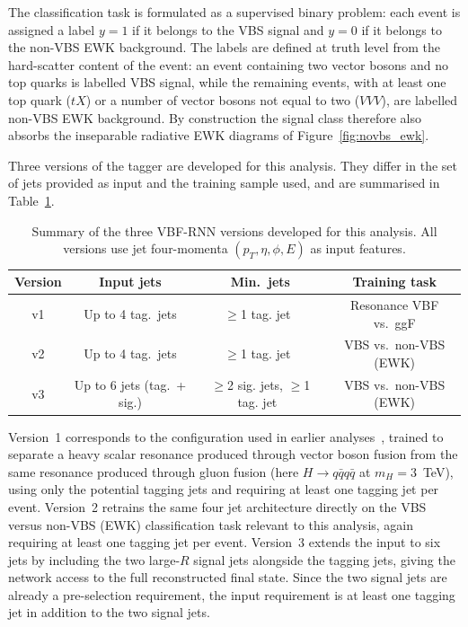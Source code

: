 The classification task is formulated as a supervised binary problem: each event is assigned a label $y = 1$ if it belongs to the VBS signal and $y = 0$ if it belongs to the non-VBS EWK background. The labels are defined at truth level from the hard-scatter content of the event: an event containing two vector bosons and no top quarks is labelled VBS signal, while the remaining events, with at least one top quark ($tX$) or a number of vector bosons not equal to two ($VVV$), are labelled non-VBS EWK background. By construction the signal class therefore also absorbs the inseparable radiative EWK diagrams of Figure~\ref{fig:novbs_ewk}.

Three versions of the tagger are developed for this analysis. They differ in the set of jets provided as input and the training sample used, and are summarised in Table~\ref{tab:vbfrnn_versions}.

\begin{table}[htbp]
  \centering
  \caption{Summary of the three VBF-RNN versions developed for this analysis. All versions use jet four-momenta $(p_T, \eta, \phi, E)$ as input features.}
  \label{tab:vbfrnn_versions}
  \begin{tabular}{|c|c|c|c|}
    \hline
    \textbf{Version} & \textbf{Input jets} & \textbf{Min.\ jets} & \textbf{Training task} \\
    \hline
    v1 & Up to 4 tag.\ jets            & $\geq$1 tag. jet\          & Resonance VBF vs.\ ggF \\
    v2 & Up to 4 tag.\ jets            & $\geq$1 tag. jet\          & VBS vs.\ non-VBS (EWK) \\
    v3 & Up to 6 jets (tag.\ + sig.)  & $\geq$2 sig. jets, $\geq$1 tag. jet\ & VBS vs.\ non-VBS (EWK) \\
    \hline
  \end{tabular}
\end{table}

Version~1 corresponds to the configuration used in earlier analyses~\cite{Antonio_VBFRNN_2023}, trained to separate a heavy scalar resonance produced through vector boson fusion from the same resonance produced through gluon fusion (here $H\to q\bar{q}q\bar{q}$ at $m_H = 3$~TeV), using only the potential tagging jets and requiring at least one tagging jet per event. Version~2 retrains the same four jet architecture directly on the VBS versus non-VBS (EWK) classification task relevant to this analysis, again requiring at least one tagging jet per event. Version~3 extends the input to six jets by including the two large-$R$ signal jets alongside the tagging jets, giving the network access to the full reconstructed final state. Since the two signal jets are already a pre-selection requirement, the input requirement is at least one tagging jet in addition to the two signal jets.

